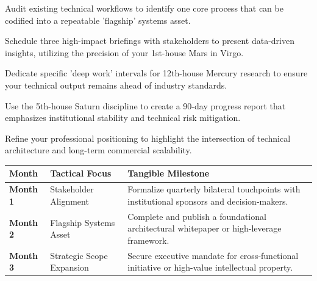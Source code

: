 \begin{diamondlist}
  \item {\fontsize{8.5}{12}\selectfont Audit existing technical workflows to identify one core process that can be codified into a repeatable 'flagship' systems asset.}
  \item {\fontsize{8.5}{12}\selectfont Schedule three high-impact briefings with stakeholders to present data-driven insights, utilizing the precision of your 1st-house Mars in Virgo.}
  \item {\fontsize{8.5}{12}\selectfont Dedicate specific 'deep work' intervals for 12th-house Mercury research to ensure your technical output remains ahead of industry standards.}
  \item {\fontsize{8.5}{12}\selectfont Use the 5th-house Saturn discipline to create a 90-day progress report that emphasizes institutional stability and technical risk mitigation.}
  \item {\fontsize{8.5}{12}\selectfont Refine your professional positioning to highlight the intersection of technical architecture and long-term commercial scalability.}
\end{diamondlist}


\begin{highlightcard}
  \sffamily\fontsize{8}{11.5}\selectfont
  \begin{tabularx}{\linewidth}{@{}l l X@{}}
    \toprule
    \textbf{Month} & \textbf{Tactical Focus} & \textbf{Tangible Milestone} \\
    \midrule
    \textbf{Month 1} & Stakeholder Alignment & Formalize quarterly bilateral touchpoints with institutional sponsors and decision-makers. \\
    \textbf{Month 2} & Flagship Systems Asset & Complete and publish a foundational architectural whitepaper or high-leverage framework. \\
    \textbf{Month 3} & Strategic Scope Expansion & Secure executive mandate for cross-functional initiative or high-value intellectual property. \\
    \bottomrule
  \end{tabularx}
\end{highlightcard}\vspace{2mm}

